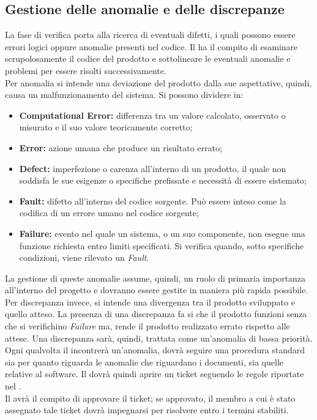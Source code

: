 	\subsection{Gestione delle anomalie e delle discrepanze}
	La fase di verifica porta alla ricerca di eventuali difetti, i quali possono essere errori logici oppure anomalie presenti nel codice. Il \roleVerifier{} ha il compito di esaminare scrupolosamente il codice del prodotto e sottolineare le eventuali anomalie e problemi per essere risolti successivamente.\\
	Per anomalia si intende una deviazione del prodotto dalla sue aspettative, quindi, causa un malfunzionamento del sistema. Si possono dividere in:
	\begin{itemize}
		\item \textbf{Computational Error:} differenza tra un valore calcolato, osservato o misurato e il suo valore teoricamente corretto;
		\item \textbf{Error:} azione umana che produce un risultato errato;
		\item \textbf{Defect:} imperfezione o carenza all'interno di un prodotto, il quale non soddisfa le sue esigenze o specifiche prefissate e necessità di essere sistemato;
		\item \textbf{Fault:} difetto all'interno del codice sorgente. Può essere inteso come la codifica di un errore umano nel codice sorgente;
		\item \textbf{Failure:} evento nel quale un sistema, o un suo componente, non esegue una funzione richiesta entro limiti specificati. Si verifica quando, sotto specifiche condizioni, viene rilevato un \emph{Fault}.
	\end{itemize}
	La gestione di queste anomalie assume, quindi, un ruolo di primaria importanza all'interno del progetto e dovranno essere gestite in maniera più rapida possibile.\\
	Per discrepanza invece, si intende una divergenza tra il prodotto sviluppato e quello atteso. La presenza di una discrepanza fa si che il prodotto funzioni senza che si verifichino \emph{Failure} ma, rende il prodotto realizzato errato rispetto alle attese. Una discrepanza sarà, quindi, trattata come un'anomalia di bassa priorità.\\
	Ogni qualvolta il \roleVerifier{} incontrerà un'anomalia, dovrà seguire una procedura standard sia per quanto riguarda le anomalie che riguardano i documenti, sia quelle relative al software. Il \roleVerifier{} dovrà quindi aprire un ticket\gloss{} seguendo le regole riportate nel \docNameVersionNdP.\\
	Il \roleProjectManager{} avrà il compito di approvare il ticket\gloss{}; se approvato, il membro a cui è stato assegnato tale ticket dovrà impegnarsi per risolvere entro i termini stabiliti.
	
